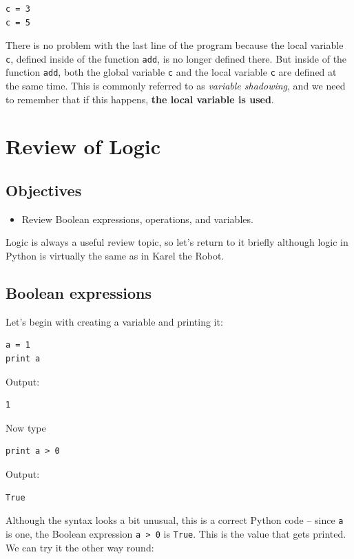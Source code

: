 \begin{verbatim}
c = 3
c = 5
\end{verbatim}
There is no 
problem with the last line of the program because the local variable {\tt c}, defined
inside of the function {\tt add}, is no longer defined there. But inside of the function
{\tt add}, both the global variable {\tt c} and the local variable {\tt c} are defined at 
the same time. This is commonly referred to as {\em variable shadowing}, and we need to 
remember that if this happens, {\bf the local variable is used}.


\section{Review of Logic}

\subsection{Objectives}

\begin{itemize}
\item Review Boolean expressions, operations, and variables.
\end{itemize}
Logic is always a useful review topic, so let's return to it briefly although logic in Python is 
virtually the same as in Karel the Robot.

\subsection{Boolean expressions}

Let's begin with creating a variable 
and printing it:

\begin{verbatim}
a = 1
print a
\end{verbatim}
Output:

\begin{verbatim}
1
\end{verbatim}
Now type

\begin{verbatim}
print a > 0
\end{verbatim}
Output:

\begin{verbatim}
True
\end{verbatim}
Although the syntax looks a bit unusual, this is a correct
Python code -- since {\tt a} is one, the Boolean expression {\tt a > 0}
is {\tt True}. This is the value that gets printed. We can try it the other 
way round:

